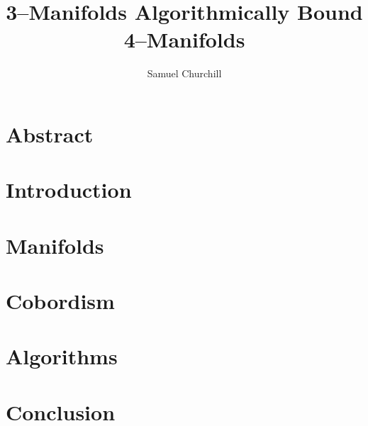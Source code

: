 \documentclass[12pt]{report}
\author{Samuel Churchill}
\title{3--Manifolds Algorithmically Bound 4--Manifolds}
\begin{document}
\maketitle

\chapter*{Abstract}

\tableofcontents
\listoffigures
\listofalgorithms


\chapter{Introduction}


\chapter{Manifolds}


\chapter{Cobordism}


\chapter{Algorithms}
\label{cha:algorithm}


\chapter{Conclusion}



% 

{}

\end{document}
